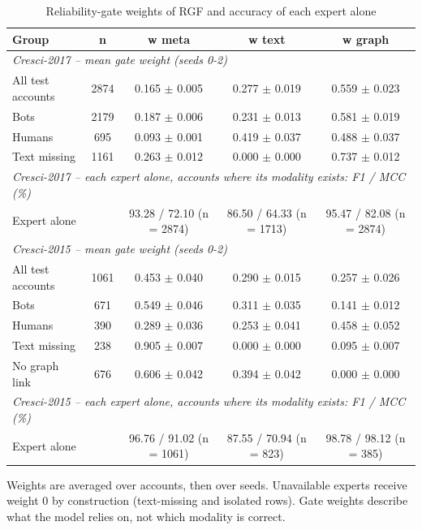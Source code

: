 \begin{table}[!t]
\caption{Reliability-gate weights of RGF and accuracy of each expert alone}
\label{tab:gate_weights}
\centering\footnotesize
\setlength{\tabcolsep}{3pt}
\begin{tabular}{lcccc}
\hline
Group & n & w meta & w text & w graph \\
\hline
\multicolumn{5}{l}{\textit{Cresci-2017 -- mean gate weight (seeds 0-2)}} \\
All test accounts & 2874 & 0.165 $\pm$ 0.005 & 0.277 $\pm$ 0.019 & 0.559 $\pm$ 0.023 \\
Bots & 2179 & 0.187 $\pm$ 0.006 & 0.231 $\pm$ 0.013 & 0.581 $\pm$ 0.019 \\
Humans & 695 & 0.093 $\pm$ 0.001 & 0.419 $\pm$ 0.037 & 0.488 $\pm$ 0.037 \\
Text missing & 1161 & 0.263 $\pm$ 0.012 & 0.000 $\pm$ 0.000 & 0.737 $\pm$ 0.012 \\
\multicolumn{5}{l}{\textit{Cresci-2017 -- each expert alone, accounts where its modality exists: F1 / MCC (\%)}} \\
Expert alone &  & 93.28 / 72.10 (n = 2874) & 86.50 / 64.33 (n = 1713) & 95.47 / 82.08 (n = 2874) \\
\multicolumn{5}{l}{\textit{Cresci-2015 -- mean gate weight (seeds 0-2)}} \\
All test accounts & 1061 & 0.453 $\pm$ 0.040 & 0.290 $\pm$ 0.015 & 0.257 $\pm$ 0.026 \\
Bots & 671 & 0.549 $\pm$ 0.046 & 0.311 $\pm$ 0.035 & 0.141 $\pm$ 0.012 \\
Humans & 390 & 0.289 $\pm$ 0.036 & 0.253 $\pm$ 0.041 & 0.458 $\pm$ 0.052 \\
Text missing & 238 & 0.905 $\pm$ 0.007 & 0.000 $\pm$ 0.000 & 0.095 $\pm$ 0.007 \\
No graph link & 676 & 0.606 $\pm$ 0.042 & 0.394 $\pm$ 0.042 & 0.000 $\pm$ 0.000 \\
\multicolumn{5}{l}{\textit{Cresci-2015 -- each expert alone, accounts where its modality exists: F1 / MCC (\%)}} \\
Expert alone &  & 96.76 / 91.02 (n = 1061) & 87.55 / 70.94 (n = 823) & 98.78 / 98.12 (n = 385) \\
\hline
\end{tabular}
\par\smallskip\parbox{\linewidth}{\scriptsize Weights are averaged over accounts, then over seeds. Unavailable experts receive weight 0 by construction (text-missing and isolated rows). Gate weights describe what the model relies on, not which modality is correct.}
\end{table}